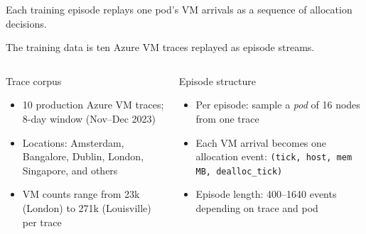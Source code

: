 \documentclass[11pt,aspectratio=43]{beamer}
\begin{document}
\begin{frame}{Each training episode replays one pod's VM arrivals as a sequence of allocation decisions.}
\begin{center}
  \end{center}
\end{frame}


\begin{frame}{The training data is ten Azure VM traces replayed as episode streams.}

  \begin{columns}[T,onlytextwidth]
      \begin{block}{Trace corpus}
        \begin{itemize}
          \item 10 production Azure VM traces; 8-day window (Nov--Dec 2023)
          \item Locations: Amsterdam, Bangalore, Dublin, London, Singapore, and others
          \item VM counts range from 23k (London) to 271k (Louisville) per trace
        \end{itemize}
      \end{block}

      \begin{block}{Episode structure}
        \begin{itemize}
          \item Per episode: sample a \emph{pod} of 16 nodes from one trace
          \item Each VM arrival becomes one allocation event: \texttt{(tick, host, mem\,MB, dealloc\_tick)}
          \item Episode length: 400--1640 events depending on trace and pod
        \end{itemize}
      \end{block}
  \end{columns}

\end{frame}
\end{document}
